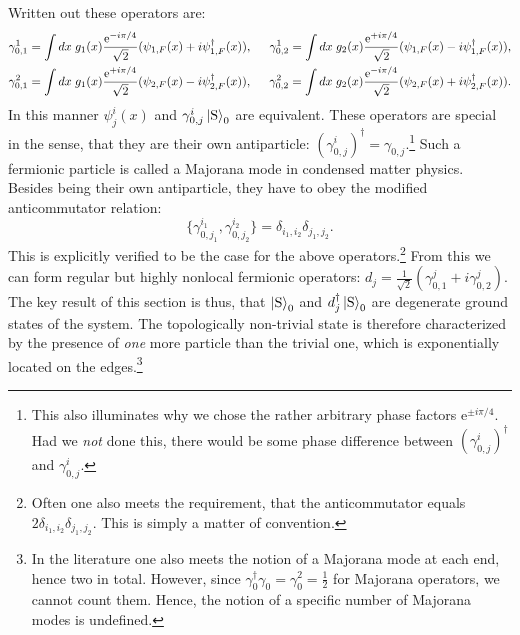 Written out these operators are: 
\begin{align}
\gamma^1_{0,1} &= \int dx \; g_1(x)\frac{\text{e}^{-i\pi/4}}{\sqrt{2}}(\psi_{1,F}(x) + i\psi^\dagger_{1,F}(x)), \hspace{0.5cm} \gamma^1_{0,2} = \int dx \; g_2(x)\frac{\text{e}^{+i\pi/4}}{\sqrt{2}}(\psi_{1,F}(x) - i\psi^\dagger_{1,F}(x)), \nonumber \\
\gamma^2_{0,1} &= \int dx \; g_1(x)\frac{\text{e}^{+i\pi/4}}{\sqrt{2}}(\psi_{2,F}(x) - i\psi^\dagger_{2,F}(x)), \hspace{0.5cm} \gamma^2_{0,2} = \int dx \; g_2(x)\frac{\text{e}^{-i\pi/4}}{\sqrt{2}}(\psi_{2,F}(x) + i \psi^\dagger_{2,F}(x)). \nonumber 
\end{align}
In this manner $\psi^{i}_{j}(x)$ and $\gamma^{i}_{0,j}\ket{\text{S}}_0$ are equivalent. These operators are special in the sense, that they are their own antiparticle: $\left(\gamma^{i}_{0,j}\right)^\dagger = \gamma_{0,j}$.\footnote{This also illuminates why we chose the rather arbitrary phase factors $\text{e}^{\pm i\pi/4}$. Had we \textit{not} done this, there would be some phase difference between $\left(\gamma^{i}_{0,j}\right)^\dagger$ and $\gamma^{i}_{0,j}$.} Such a fermionic particle is called a Majorana mode in condensed matter physics. Besides being their own antiparticle, they have to obey the modified anticommutator relation:
\begin{equation}
\{\gamma^{i_1}_{0,j_1}, \gamma^{i_2}_{0,j_2} \} = \delta_{i_1,i_2}\delta_{j_1,j_2}. \nonumber
\end{equation}
This is explicitly verified to be the case for the above operators.\footnote{Often one also meets the requirement, that the anticommutator equals $2\delta_{i_1,i_2}\delta_{j_1,j_2}$. This is simply a matter of convention.} From this we can form regular but highly nonlocal fermionic operators: $d_j = \frac{1}{\sqrt{2}}(\gamma^{j}_{0,1} + i\gamma^{j}_{0,2})$. The key result of this section is thus, that $\ket{\text{S}}_0$ and $d_j^\dagger\ket{\text{S}}_0$ are degenerate ground states of the system. The topologically non-trivial state is therefore characterized by the presence of \textit{one} more particle than the trivial one, which is exponentially located on the edges.\footnote{In the literature one also meets the notion of a Majorana mode at each end, hence two in total. However, since $\gamma^\dagger_0\gamma_0 = \gamma_0^2 = \frac{1}{2}$ for Majorana operators, we cannot count them. Hence, the notion of a specific number of Majorana modes is undefined.}

